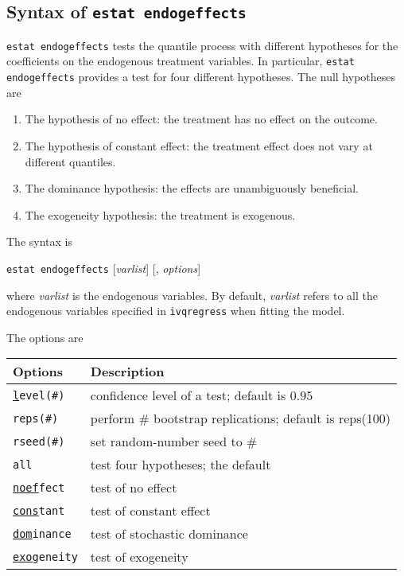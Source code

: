 \subsection{Syntax of {\tt estat endogeffects}}
{\tt estat endogeffects} tests the quantile process with different hypotheses 
for the coefficients on the endogenous treatment variables. In particular,
{\tt estat endogeffects} provides a test for four different hypotheses.  The null
hypotheses are 
\begin{enumerate}
  \item The hypothesis of no effect: the treatment has no effect on the
    outcome.

  \item The hypothesis of constant effect: the treatment effect does not vary at
    different quantiles.

  \item The dominance hypothesis: the effects are unambiguously beneficial.

  \item The exogeneity hypothesis: the treatment is exogenous.
\end{enumerate}

\vskip 0.5cm
\noindent
The syntax is 

\vskip 0.5cm
{\tt estat endogeffects} [{\it varlist}] [, {\it options}]

\vskip 0.5cm
\noindent
where {\it varlist} is the endogenous variables. By default, {\it varlist}
refers to all the endogenous variables specified in {\tt ivqregress} when
fitting the model.

\vskip 0.5cm
\noindent
The options are

\vskip 0.5cm
\begin{tabular}{ll}
\hline
Options & Description \\
\hline
{\tt \underline{l}evel(\#)} & confidence level of a test; default is $0.95$ \\
{\tt reps(\#)} & perform \# bootstrap replications; default is reps(100) \\
{\tt rseed(\#)}&  set random-number seed to \# \\
{\tt all} & test four hypotheses; the default \\
{\tt \underline{noef}fect} & test of no effect \\
{\tt \underline{cons}tant} & test of constant effect \\
{\tt \underline{dom}inance} & test of stochastic dominance \\
{\tt \underline{exog}eneity} & test of exogeneity \\
\hline
\end{tabular}

